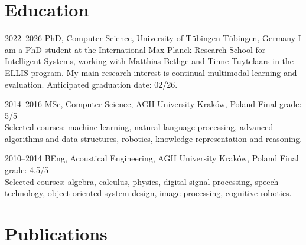 \documentclass[]{friggeri-cv_osx}
\begin{document}
\section{Education}
\begin{entrylist}
\entry
{2022–2026}
{PhD, Computer Science, University of Tübingen}
{Tübingen, Germany}
{I am a PhD student at the International Max Planck Research School for Intelligent Systems, working with Matthias Bethge and Tinne Tuytelaars in the ELLIS program. My main research interest is continual multimodal learning and evaluation. Anticipated graduation date: 02/26.\\}

\entry
{2014–2016}
{MSc, Computer Science, AGH University}
{Kraków, Poland}
{Final grade: 5/5\\
Selected courses: machine learning, natural language processing, advanced algorithms and data structures, robotics, knowledge representation and reasoning.\\}

\entry
{2010–2014}
{BEng, Acoustical Engineering, AGH University}
{Kraków, Poland}
{Final grade: 4.5/5\\
Selected courses: algebra, calculus, physics, digital signal processing, speech technology, object-oriented system design, image processing, cognitive robotics.}
\end{entrylist}

\newpage
\section{Publications}
\end{document}

